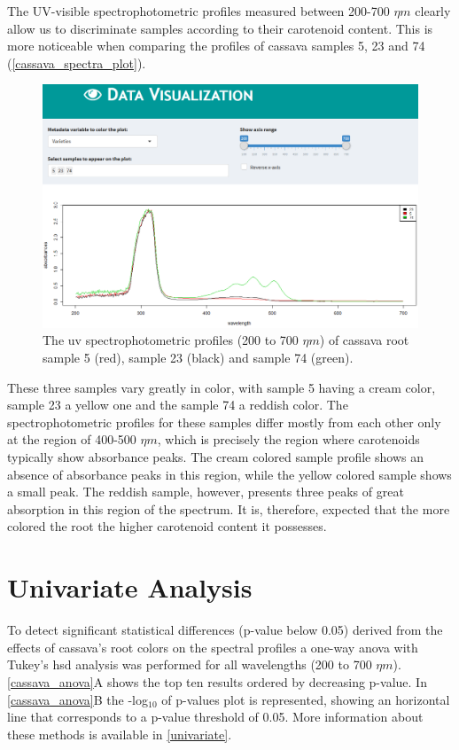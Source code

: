 The UV-visible spectrophotometric profiles measured between 200-700 $\eta m$ clearly allow us to discriminate samples according to their carotenoid content. This is more noticeable when comparing the profiles of cassava samples
5, 23 and 74 (\autoref{cassava_spectra_plot}).

\begin{figure}[H]
	\centering
	\includegraphics[width=0.8\linewidth]{Imagens/Case_study/spectra_plot}
	\caption{The \gls{uv} spectrophotometric profiles (200 to 700 $\eta m$) of cassava root sample 5 (red), sample 23 (black) and sample 74 (green).}
	\label{cassava_spectra_plot}
\end{figure}

These three samples vary greatly in color, with sample 5 having a cream color, sample 23 a yellow one and the sample 74 a reddish color. The spectrophotometric profiles for these samples differ mostly from each other only at the region of 400-500 $\eta m$, which is precisely the region where carotenoids typically show absorbance peaks. The cream colored sample profile shows an absence of absorbance peaks in this region, while the yellow colored sample shows a small peak. The reddish sample, however, presents three peaks of great absorption in this region of the spectrum. It is, therefore, expected that the more colored the root the higher carotenoid content it possesses.



\section{Univariate Analysis}

To detect significant statistical differences (p-value below 0.05) derived from the effects of cassava's root colors on the spectral profiles a one-way \gls{anova} with Tukey's \gls{hsd} analysis was performed for all wavelengths (200 to 700 $\eta m$). \autoref{cassava_anova}A shows the top ten results ordered by decreasing p-value. In \autoref{cassava_anova}B the -log$_{10}$ of p-values plot is represented, showing an horizontal line that corresponds to a p-value threshold of 0.05. More information about these methods is available in \autoref{univariate}.

